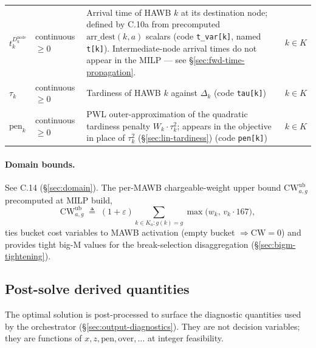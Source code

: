 \documentclass[11pt,a4paper]{article}
\newcommand{\defeq}{\triangleq}
\theoremstyle{definition}
\begin{document}
\begin{table}[H]
\begin{tabular}{p{3.5cm}p{2.5cm}p{6cm}p{1.5cm}}
$t_k^{D_k^{\text{node}}}$ & continuous $\geq 0$ & Arrival time of HAWB $k$ at its destination node; defined by C.10a from precomputed $\text{arr\_dest}(k, a)$ scalars (code \texttt{t\_var[k]}, named \texttt{t[k]}). Intermediate-node arrival times do not appear in the MILP --- see \S\ref{sec:fwd-time-propagation}. & $k \in K$ \\
$\tau_k$ & continuous $\geq 0$ & Tardiness of HAWB $k$ against $\Delta_k$ (code \texttt{tau[k]}) & $k \in K$ \\
$\text{pen}_k$ & continuous $\geq 0$ & PWL outer-approximation of the quadratic tardiness penalty $W_k \cdot \tau_k^2$; appears in the objective in place of $\tau_k^2$ (\S\ref{sec:lin-tardiness}) (code \texttt{pen[k]}) & $k \in K$ \\
\bottomrule
\end{tabular}
\end{table}

\paragraph{Domain bounds.}
See C.14 (\S\ref{sec:domain}). The per-MAWB chargeable-weight upper bound
$\text{CW}^{\text{ub}}_{a,g}$ precomputed at MILP build,
\[
  \text{CW}^{\text{ub}}_{a,g} \;\defeq\; (1 + \varepsilon) \sum_{k \in K_a : g(k) = g} \max\bigl(w_k,\, v_k \cdot 167\bigr),
\]
ties bucket cost variables to MAWB activation (empty bucket $\Rightarrow
\text{CW} = 0$) and provides tight big-M values for the break-selection
disaggregation (\S\ref{sec:bigm-tightening}).

\subsection*{Post-solve derived quantities}

The optimal solution is post-processed to surface the diagnostic quantities
used by the orchestrator (\S\ref{sec:output-diagnostics}). They are not
decision variables; they are functions of $x, z, \text{pen}, \text{over},
\ldots$ at integer feasibility.
\end{document}
